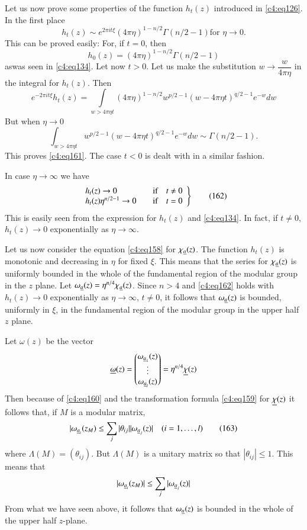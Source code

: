 Let us now prove some properties of the function $h_{t}(z)$ introduced
in \eqref{c4:eq126}. In the first place
\begin{equation*}
h_{t}(z)\sim e^{2\pi i t\xi}(4\pi \eta)^{1-n/2}\Gamma(n/2-1)\text{
  \ for \ } \eta\to 0.\tag{161}\label{c4:eq161}
\end{equation*}
This can be proved easily: For, if $t=0$, then
$$
h_{0}(z)=(4\pi\eta)^{1-n/2}\Gamma(n/2-1) 
$$
as\pageoriginale was seen in \eqref{c4:eq134}. Let now $t>0$. Let us make
the substitution $w\to \dfrac{w}{4\pi \eta}$ in the integral for
$h_{t}(z)$. Then
$$
e^{-2\pi it\xi}h_{t}(z)=\int\limits_{w>4\pi\eta
  t}(4\pi\eta)^{1-n/2}w^{p/2-1}(w-4\pi\eta t)^{q/2-1}e^{-w}dw
$$
But when $\eta\to 0$
$$
\int_{w>4\pi\eta t}w^{p/2-1}(w-4\pi \eta
t)^{q/2-1}e^{-w}dw\sim\Gamma(n/2-1). 
$$
This proves \eqref{c4:eq161}. The case $t<0$ is dealt with in a similar
fashion.

In case $\eta\to \infty$ we have
\begin{equation*}
\left.
\begin{array}{l@{\qquad}c@{\quad}l}
h_{t}(z)\to 0 & \text{if} & t\neq 0\\
h_{t}(z)\eta^{n/2-1}\to 0 & \text{if} & t=0
\end{array}
\right\}\tag{162}\label{c4:eq162}
\end{equation*}
This is easily seen from the expression for $h_{t}(z)$ and
\eqref{c4:eq134}. In fact, if $t\neq 0$, $h_{t}(z)\to 0$ exponentially as
$\eta\to \infty$.

Let us now consider the equation \eqref{c4:eq158} for
$\chi_{\underline{a}}(z)$. The function $h_{t}(z)$ is monotonic and
decreasing in $\eta$ for fixed $\xi$. This means that the series for
$\chi_{\underline{a}}(z)$ is uniformly bounded in the whole of the
fundamental region of the modular group in the $z$ plane. Let
$\omega_{\underline{a}}(z)=\eta^{n/4}\chi_{\underline{a}}(z)$. Since $n > 4$ and
\eqref{c4:eq162} holds with $h_{t}(z)\to 0$ exponentially as $\eta\to
\infty$, $t\neq 0$, it follows that $\omega_{\underline{a}}(z)$ is bounded,
uniformly in $\xi$, in the fundamental region of the modular group in
the upper half $z$ plane.

Let $\omega(z)$ be the vector 
$$
\underline{\omega}(z)=
\begin{pmatrix}
\omega_{\underline{a}_{1}}(z)\\
\vdots\\
\omega_{\underline{a}_{l}}(z)
\end{pmatrix}
=\eta^{n/4}\underline{\chi}(z)
$$\pageoriginale
Then because of \eqref{c4:eq160} and the transformation formula \eqref{c4:eq159}
for $\underline{\chi}(z)$ it follows that, if $M$ is a modular matrix,
\begin{equation*}
|\omega_{\underline{a}_{i}}(z_{M})\leq
\sum_{j}|\theta_{ij}||\omega_{\underline{a}_{j}}(z)|\quad
(i=1,\ldots,l)\tag{163}\label{c4:eq163} 
\end{equation*}
where $\Lambda(M)=(\theta_{ij})$. But $\Lambda(M)$ is a unitary matrix
so that $|\theta_{ij}|\leq 1$. This means that
$$
|\omega_{\underline{a}_{i}}(z_{M})|\leq \sum_{j}|\omega_{\underline{a}_{j}}(z)|
$$
From what we have seen above, it follows that $\omega_{\underline{a}}(z)$ is
bounded in the whole of the upper half $z$-plane.

